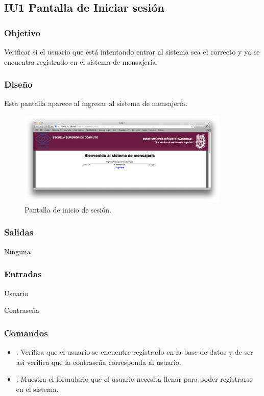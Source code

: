 
		
		\subsection{IU1 Pantalla de Iniciar sesi\'on}

\subsubsection{Objetivo}
	Verificar si el usuario que est\'a intentando entrar al sistema sea el correcto y ya se encuentra registrado en el sistema de mensajer\'ia.

\subsubsection{Dise\~no}
	Esta pantalla aparece al ingresar al sistema de mensajer\'ia. 

	\begin{figure}[htbp!]
		\centering
			\includegraphics[width=0.9\textwidth]{images/Modulo1/Login}
		\caption{Pantalla de inicio de sesi\'on.}
	\end{figure}

\subsubsection{Salidas}
Ninguna


\subsubsection{Entradas}
\begin{Citemize}

\item Usuario 
\item Contrase\~na
\end{Citemize}

\subsubsection{Comandos}
\begin{itemize}
	\item {}: Verifica que el usuario se encuentre registrado en la base de datos y de ser as\'i verifica que la contrase\~na corresponda al usuario. 
	\item {}: Muestra el formulario que el usuario necesita llenar para poder registrarse en el sistema.
\end{itemize}

